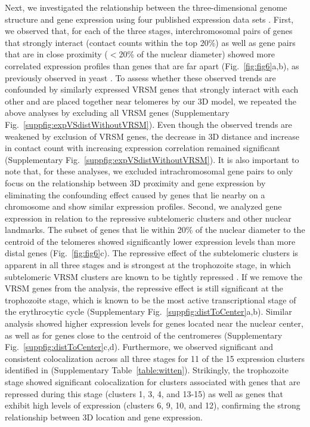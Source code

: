 Next, we investigated the relationship between the three-dimensional genome structure and gene expression using four published expression data sets \citep{leroch:discovery, lopez-barragan:directional, otto:new, bunnik:polysome}. First, we observed that, for each of the three stages, interchromosomal pairs of genes that strongly interact (contact counts within the top 20\%) as well as gene pairs that are in close proximity ($<$20\% of the nuclear diameter) showed more correlated expression profiles than genes that are far apart (Fig.~\ref{fig:fig6}a,b), as previously observed in yeast \citep{homouz:3d}. To assess whether these observed trends are confounded by similarly expressed VRSM genes that strongly interact with each other and are placed together near telomeres by our 3D model, we repeated the above analyses by excluding all VRSM genes (Supplementary Fig.~\ref*{suppfig:expVSdistWithoutVRSM}). Even though the observed trends are weakened by exclusion of VRSM genes, the decrease in 3D distance and increase in contact count with increasing expression correlation remained significant (Supplementary Fig.~\ref*{suppfig:expVSdistWithoutVRSM}). It is also important to note that, for these analyses, we excluded intrachromosomal gene pairs to only focus on the relationship between 3D proximity and gene expression by eliminating the confounding effect caused by genes that lie nearby on a chromosome and show similar expression profiles. Second, we analyzed gene expression in relation to the repressive subtelomeric clusters \citep{duraisingh:heterochromatin, dzikowski:mechanisms, lopez-rubio:genome-wide} and other nuclear landmarks. The subset of genes that lie within 20\% of the nuclear diameter to the centroid of the telomeres showed significantly lower expression levels than more distal genes (Fig.~\ref{fig:fig6}c). The repressive effect of the subtelomeric clusters is apparent in all three stages and is strongest at the trophozoite stage, in which subtelomeric VRSM clusters are known to be tightly repressed \citep{chen:developmental}. If we remove the VRSM genes from the analysis, the repressive effect is still significant at the trophozoite stage, which is known to be the most active transcriptional stage of the erythrocytic cycle (Supplementary Fig.~\ref*{suppfig:distToCenter}a,b). Similar analysis showed higher expression levels for genes located near the nuclear center, as well as for genes close to the centroid of the centromeres (Supplementary Fig.~\ref*{suppfig:distToCenter}c,d). Furthermore, we observed significant and consistent colocalization across all three stages for 11 of the 15 expression clusters identified in \cite{leroch:discovery} (Supplementary Table~\ref*{table:witten}). Strikingly, the trophozoite stage showed significant colocalization for clusters associated with genes that are repressed during this stage (clusters 1, 3, 4, and 13-15) as well as genes that exhibit high levels of expression (clusters 6, 9, 10, and 12), confirming the strong relationship between 3D location and gene expression.

